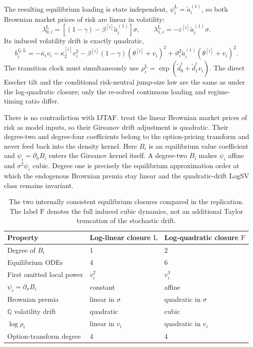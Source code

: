 \documentclass[11pt]{article}
\theoremstyle{remark}
\newcommand{\QQ}{\mathbb{Q}}
\begin{document}
The resulting equilibrium loading is state independent,
$\psi_i^{\mathrm L}=\widetilde a_i^{(1)}$, so both Brownian market prices of risk
are linear in volatility:
\begin{equation}\label{eq:regime_linear_mpr}
\lambda_{0,i}^{\mathrm L}
=\left[(1-\gamma)-\beta^{[i]}\widetilde a_i^{(1)}\right]\sigma,
\qquad
\lambda_{1,i}^{\mathrm L}
=-\varepsilon^{[i]}\widetilde a_i^{(1)}\sigma.
\end{equation}
Its induced volatility drift is exactly quadratic,
\begin{equation}\label{eq:regime_quadratic_Q_drift}
b_i^{\QQ,\mathrm L}
=-\bar\kappa_i v_i-\kappa_2^{[i]}v_i^2
-\beta^{[i]}(1-\gamma)(\theta^{[i]}+v_i)^2
+\vartheta_i^2\widetilde a_i^{(1)}(\theta^{[i]}+v_i)^2.
\end{equation}
The transition clock must simultaneously use
$\rho_i^{\mathrm L}=\exp(\widetilde d_0^i+\widetilde d_1^iv_i)$.
The direct Esscher tilt and the conditional risk-neutral jump-size law are the
same as under the log-quadratic closure; only the re-solved continuous loading and
regime-timing ratio differ.

There is no contradiction with IJTAF.  \cite{SeppRakhmonov2024} treat the linear
Brownian market prices of risk as model inputs, so their Girsanov drift adjustment
is quadratic.  Their degree-two
and degree-four coefficients belong to the option-pricing transform and never feed
back into the density kernel.  Here $B_i$ is an equilibrium value coefficient and
$\psi_i=\partial_\sigma B_i$ enters the Girsanov kernel itself.  A degree-two $B_i$
makes $\psi_i$ affine and $\sigma^2\psi_i$ cubic.  Degree one is precisely the
equilibrium approximation order at which the endogenous Brownian premia stay
linear and the quadratic-drift LogSV class remains invariant.

\begin{table}[htbp]
\centering
\small
\begin{tabular}{lll}
\toprule
Property & Log-linear closure $\mathrm L$ & Log-quadratic closure $\mathrm F$\\
\midrule
Degree of $B_i$ & 1 & 2\\
Equilibrium ODEs & 4 & 6\\
First omitted local power & $v_i^2$ & $v_i^3$\\
$\psi_i=\partial_\sigma B_i$ & constant & affine\\
Brownian premia & linear in $\sigma$ & quadratic in $\sigma$\\
$\QQ$ volatility drift & quadratic & cubic\\
$\log\rho_i$ & linear in $v_i$ & quadratic in $v_i$\\
Option-transform degree & 4 & 4\\
\bottomrule
\end{tabular}
\caption{The two internally consistent equilibrium closures compared in the
replication.  The label $\mathrm F$ denotes the full induced cubic dynamics, not
an additional Taylor truncation of the stochastic drift.}
\label{tab:regime_closures}
\end{table}
\end{document}
